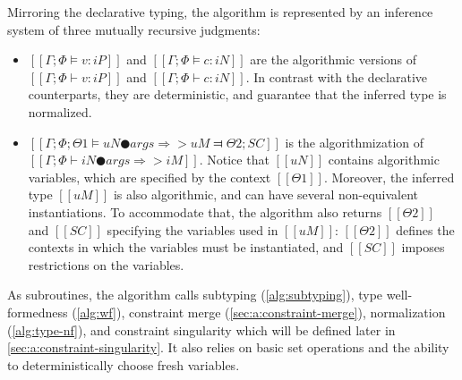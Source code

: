 Mirroring the declarative typing, 
the algorithm is represented by an inference system of three mutually recursive
judgments:
\begin{itemize}
  \item $[[Γ ; Φ ⊨ v : iP]]$ and  $[[Γ ; Φ ⊨ c : iN]]$
    are the algorithmic versions of $[[Γ ; Φ ⊢ v : iP]]$ and $[[Γ ; Φ ⊢ c : iN]]$.
    In contrast with the declarative counterparts, they are deterministic,
    and guarantee that the inferred type is normalized. 
  \item $[[Γ ; Φ ; Θ1 ⊨ uN ● args ⇒> uM ⫤ Θ2 ; SC]]$
    is the algorithmization of $[[Γ ; Φ ⊢ iN ● args ⇒> iM]]$.
    Notice that $[[uN]]$ contains algorithmic variables, 
    which are specified by the context $[[Θ1]]$.
    Moreover, the inferred type $[[uM]]$ is also algorithmic,
    and can have several non-equivalent instantiations. To accommodate that, 
    the algorithm also returns $[[Θ2]]$ and $[[SC]]$ specifying 
    the variables used in $[[uM]]$: $[[Θ2]]$ defines the contexts
    in which the variables must be instantiated, and $[[SC]]$
    imposes restrictions on the variables. 
\end{itemize}
As subroutines, the algorithm calls
subtyping (\cref{alg:subtyping}),
type well-formedness (\cref{alg:wf}),
constraint merge (\cref{sec:a:constraint-merge}),
normalization (\cref{alg:type-nf}),
and constraint singularity which will be defined later in 
\cref{sec:a:constraint-singularity}.
It also relies on basic set operations and the ability to 
deterministically choose fresh variables.

\begin{algorithm}
  \hfill \\
  \ottdefnATPInfLabeled[\apppref]{}
  \hfill \\
  \ottdefnATNInfLabeled[\apppref]{}
  \hfill \\
  \ottdefnATSpinInfLabeled[\apppref]{}
\end{algorithm}

